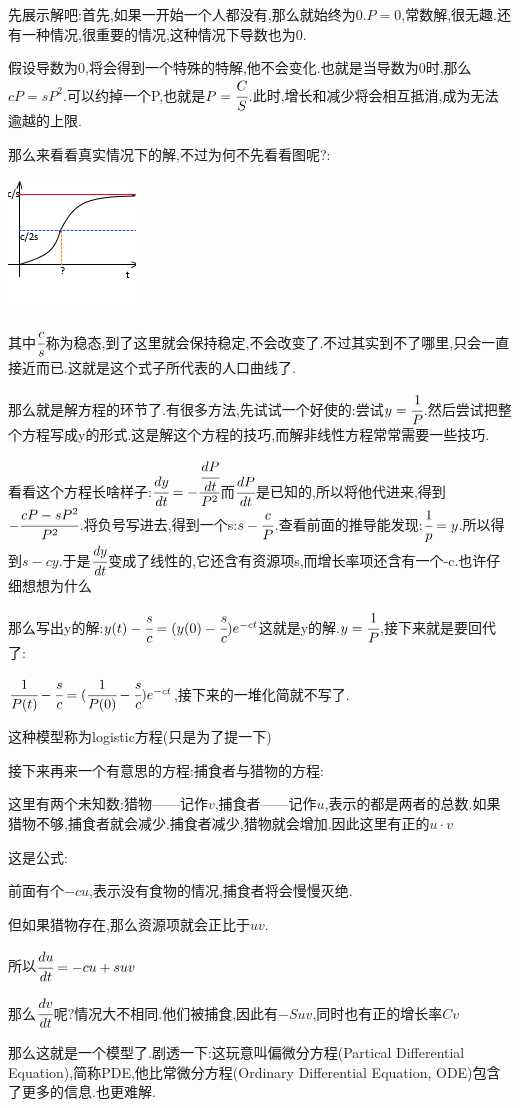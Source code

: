 {{{  先展示解吧:首先,如果一开始一个人都没有,那么就始终为0.$P = 0$,常数解,很无趣.还有一种情况,很重要的情况,这种情况下导数也为0.

  假设导数为0,将会得到一个特殊的特解,他不会变化.也就是当导数为0时,那么$cP = sP^2$.可以约掉一个P,也就是$P = \cfrac{C}{S}$.此时,增长和减少将会相互抵消,成为无法逾越的上限.

  那么来看看真实情况下的解,不过为何不先看看图呢?:

  \begin{center}
    \includegraphics{resources/nonLinearDifferencialEquation_HumanGrow.png}
  \end{center}

  其中$\cfrac{c}{s}$称为稳态,到了这里就会保持稳定,不会改变了.不过其实到不了哪里,只会一直接近而已.这就是这个式子所代表的人口曲线了.

  那么就是解方程的环节了.有很多方法,先试试一个好使的:尝试$y = \cfrac{1}{P}$.然后尝试把整个方程写成y的形式.这是解这个方程的技巧,而解非线性方程常常需要一些技巧.

  看看这个方程长啥样子:$\cfrac{dy}{dt} = -\cfrac{\cfrac{dP}{dt}}{P^2}$而$\cfrac{dP}{dt}$是已知的,所以将他代进来,得到$-\cfrac{cP - sP^2}{P^2}$.将负号写进去,得到一个s:$s - \cfrac{c}{P}$.查看前面的推导能发现:$\cfrac{1}{p} = y$.所以得到$s - cy$.于是$\cfrac{dy}{dt}$变成了线性的,它还含有资源项s,而增长率项还含有一个-c.也许仔细想想为什么

  那么写出y的解:$y(t) - \cfrac{s}{c} = (y(0) - \cfrac{s}{c})e^{-ct}$这就是y的解.$y = \cfrac{1}{P}$,接下来就是要回代了:

  $\cfrac{1}{P(t)} - \cfrac{s}{c} = (\cfrac{1}{P(0)} - \cfrac{s}{c})e^{-ct}$,接下来的一堆化简就不写了.

  这种模型称为logistic方程(只是为了提一下)

  接下来再来一个有意思的方程:捕食者与猎物的方程:

  这里有两个未知数:猎物——记作$v$,捕食者——记作$u$,表示的都是两者的总数.如果猎物不够,捕食者就会减少.捕食者减少,猎物就会增加.因此这里有正的$u \cdot v$

  这是公式:

  前面有个$-cu$,表示没有食物的情况,捕食者将会慢慢灭绝.

  但如果猎物存在,那么资源项就会正比于$uv$.

  所以$\cfrac{du}{dt} = -cu + suv$

  那么$\cfrac{dv}{dt}$呢?情况大不相同.他们被捕食,因此有$-Suv$,同时也有正的增长率$Cv$

  那么这就是一个模型了.剧透一下:这玩意叫偏微分方程(Partical Differential Equation),简称PDE,他比常微分方程(Ordinary Differential Equation, ODE)包含了更多的信息.也更难解.

}%

}%

}%

